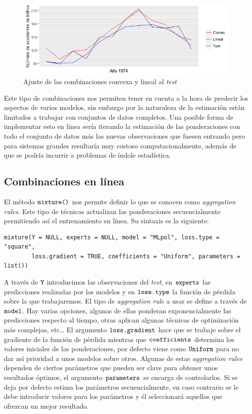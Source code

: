 \begin{figure}
    \centering
    \centerline{\includegraphics[scale = 0.7]{Images/Modelizacion/336337.png}}
    \caption{Ajuste de las combinaciones convexa y lineal al \textit{test}}
    \label{lin_conv}
\end{figure}

Este tipo de combinaciones nos permiten tener en cuenta a la hora de predecir los aspectos de varios modelos, sin embargo por la naturaleza de la estimación están limitados a trabajar con conjuntos de datos completos. Una posible forma de implementar esto en línea sería iterando la estimación de las ponderaciones con todo el conjunto de datos más las nuevas observaciones que fuesen entrando pero para sistemas grandes resultaría muy costoso computacionalmente, además de que se podría incurrir a problemas de índole estadística.

\subsection{Combinaciones en línea}
El método $\verb!mixture()!$ nos permite definir lo que se conocen como \textit{aggregation rules}. Este tipo de técnicas actualizan las ponderaciones secuencialmente permitiendo así el entrenamiento en línea. Su sintaxis es la siguiente:
\begin{Verbatim}[fontsize=\footnotesize]
mixture(Y = NULL, experts = NULL, model = "MLpol", loss.type = "square",
        loss.gradient = TRUE, coefficients = "Uniform", parameters = list())
\end{Verbatim}

A través de $\verb!Y!$ introducimos las observaciones del \textit{test}, en $\verb!experts!$ las predicciones realizadas por los modelos y en $\verb!loss.type!$ la función de pérdida sobre la que trabajaremos. El tipo de \textit{aggregation rule} a usar se define a través de $\verb!model!$. Hay varias opciones, algunas de ellas ponderan exponencialmente las predicciones respecto al tiempo, otras aplican algunas técnicas de optimización más complejas, etc…  El argumento $\verb!loss.gradient!$ hace que se trabaje sobre el gradiente de la función de pérdida mientras que $\verb!coefficients!$ determina los valores iniciales de las ponderaciones, por defecto viene como $\verb!Uniform!$ para no dar así prioridad a unos modelos sobre otros. Algunas de estas \textit{aggregation rules} dependen de ciertos parámetros que pueden ser clave para obtener unos resultados óptimos, el argumento $\verb!parameters!$ se encarga de controlarlos. Si se deja por defecto estima los parámetros secuencialmente, en caso contrario se le debe introducir valores para los parámetros y él seleccionará aquellos que ofrezcan un mejor resultado.

